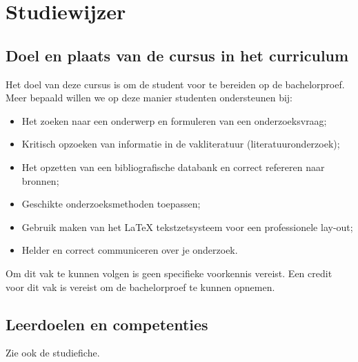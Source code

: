 \chapter*{Studiewijzer}
\label{ch:studiewijzer}

\section{Doel en plaats van de cursus in het curriculum}
\label{sec:doel-en-plaats}

Het doel van deze cursus is om de student voor te bereiden op de bachelorproef. Meer bepaald willen we op deze manier studenten ondersteunen bij:

\begin{itemize}
  \item Het zoeken naar een onderwerp en formuleren van een onderzoeksvraag;
  \item Kritisch opzoeken van informatie in de vakliteratuur (literatuuronderzoek);
  \item Het opzetten van een bibliografische databank en correct refereren naar bronnen;
  \item Geschikte onderzoeksmethoden toepassen;
  \item Gebruik maken van het {\LaTeX} tekstzetsysteem voor een professionele lay-out;
  \item Helder en correct communiceren over je onderzoek.
\end{itemize}

Om dit vak te kunnen volgen is geen specifieke voorkennis vereist. Een credit voor dit vak is vereist om de bachelorproef te kunnen opnemen.

\section{Leerdoelen en competenties}
\label{sec:leerdoelen}

Zie ook de studiefiche.

